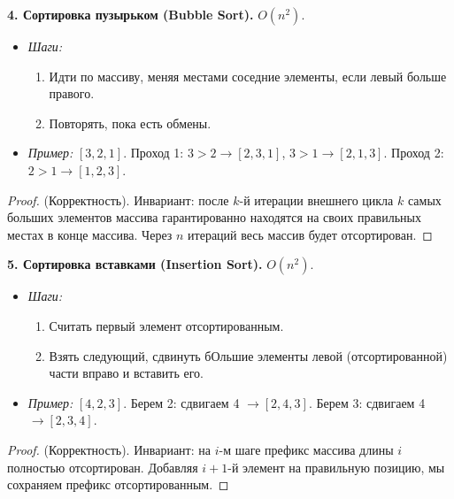 \documentclass[12pt, a4paper]{article}
\begin{document}
\textbf{4. Сортировка пузырьком (Bubble Sort).} $O(n^2)$.
\begin{itemize}
    \item \textit{Шаги:}
    \begin{enumerate}
        \item Идти по массиву, меняя местами соседние элементы, если левый больше правого.
        \item Повторять, пока есть обмены.
    \end{enumerate}
    \item \textit{Пример:} $[3, 2, 1]$. Проход 1: $3>2 \to [2, 3, 1]$, $3>1 \to [2, 1, 3]$. Проход 2: $2>1 \to[1, 2, 3]$.
\end{itemize}
\begin{proof}
(Корректность). Инвариант: после $k$-й итерации внешнего цикла $k$ самых больших элементов массива гарантированно находятся на своих правильных местах в конце массива. Через $n$ итераций весь массив будет отсортирован.
\end{proof}

\textbf{5. Сортировка вставками (Insertion Sort).} $O(n^2)$.
\begin{itemize}
    \item \textit{Шаги:}
    \begin{enumerate}
        \item Считать первый элемент отсортированным.
        \item Взять следующий, сдвинуть бОльшие элементы левой (отсортированной) части вправо и вставить его.
    \end{enumerate}
    \item \textit{Пример:} $[4, 2, 3]$. Берем 2: сдвигаем 4 $\to[2, 4, 3]$. Берем 3: сдвигаем 4 $\to [2, 3, 4]$.
\end{itemize}
\begin{proof}
(Корректность). Инвариант: на $i$-м шаге префикс массива длины $i$ полностью отсортирован. Добавляя $i+1$-й элемент на правильную позицию, мы сохраняем префикс отсортированным.
\end{proof}
\end{document}
